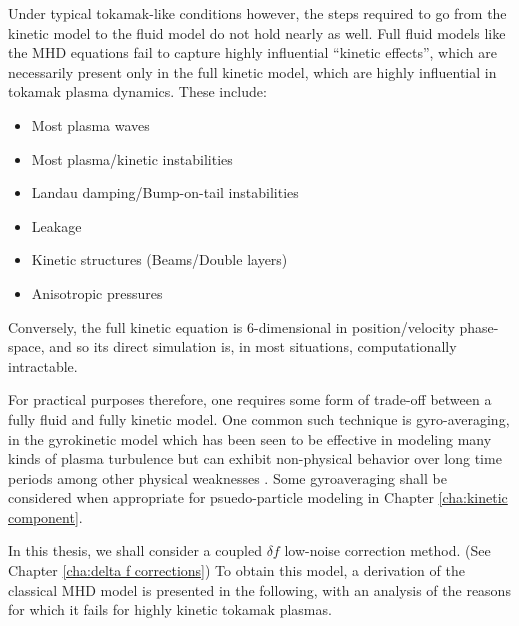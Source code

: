     Under typical tokamak-like conditions however, the steps required to go from the kinetic model to the fluid model do not hold nearly as well. Full fluid models like the MHD equations fail to capture highly influential ``kinetic effects'', which are necessarily present only in the full kinetic model, which are highly influential in tokamak plasma dynamics. These include:
    \begin{itemize}
        \item  Most plasma waves \BA{[Ref]}
        \item  Most plasma/kinetic instabilities \BA{[Ref]}
        \item  Landau damping/Bump-on-tail instabilities \BA{[Ref]}
        \item  Leakage \BA{[Ref]}
        \item  Kinetic structures (Beams/Double layers) \BA{[Ref]}
        \item  Anisotropic pressures \BA{[Ref]}
    \end{itemize}
    Conversely, the full kinetic equation is 6-dimensional in position/velocity phase-space, and so its direct simulation is, in most situations, computationally intractable.

    For practical purposes therefore, one requires some form of trade-off between a fully fluid and fully kinetic model. One common such technique is gyro-averaging, in the gyrokinetic model \cite{Howes_et_al_2006, Parra_Barnes_Peters_2011, Abel_et_al_2013} which has been seen to be effective in modeling many kinds of plasma turbulence \cite{McKee_et_al_2001} but can exhibit non-physical behavior over long time periods \BA{[Ref]} among other physical weaknesses \BA{[Ref]}. Some gyroaveraging shall be considered when appropriate for psuedo-particle modeling in Chapter \ref{cha:kinetic component}. 
    
    In this thesis, we shall consider a coupled $\delta\!f$ low-noise correction method. (See Chapter \ref{cha:delta f corrections}) To obtain this model, a derivation of the classical MHD model is presented in the following, with an analysis of the reasons for which it fails for highly kinetic tokamak plasmas.

    
    
    
    
